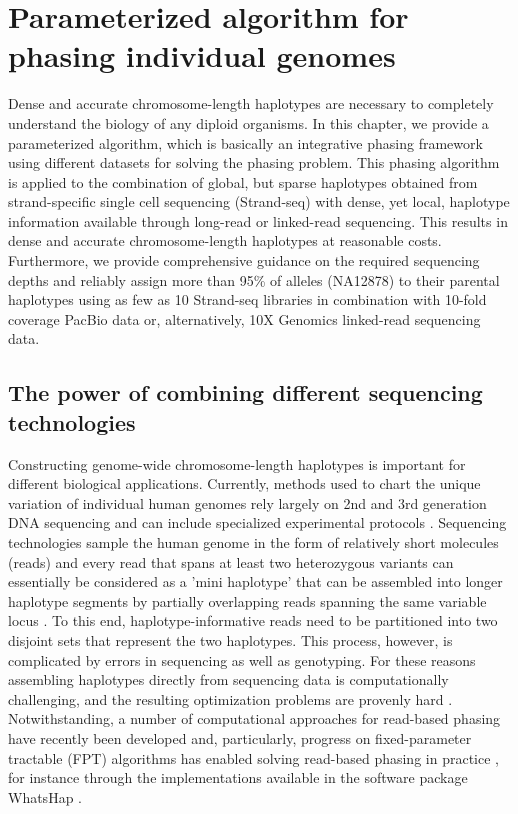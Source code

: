 \chapter{Parameterized algorithm for phasing individual genomes}
Dense and accurate chromosome-length haplotypes are necessary to completely understand the biology of any diploid organisms.  
In this chapter, we provide a parameterized algorithm, which is basically an integrative phasing framework using different datasets for solving the phasing problem. 
This phasing algorithm is applied to the combination of global, but sparse haplotypes obtained from strand-specific single cell sequencing (Strand-seq) with dense, yet local, haplotype information available through long-read or linked-read sequencing.
This results in dense and accurate chromosome-length haplotypes at reasonable costs. 
Furthermore, we provide comprehensive guidance on the required sequencing depths and reliably assign more than 95\% of alleles (NA12878) to their parental haplotypes using as few as 10 Strand-seq libraries in combination with 10-fold coverage PacBio data or, alternatively, 10X Genomics linked-read sequencing data.

\section{The power of combining different sequencing technologies}
Constructing genome-wide chromosome-length haplotypes is important for different biological applications.
Currently, methods used to chart the unique variation of individual human genomes rely largely on 2nd and 3rd generation DNA sequencing and can include specialized experimental protocols \citep{snyder2015haplotype, porubsky2016direct, de2014targeted, amini2014haplotype, selvaraj2013whole}. 
Sequencing technologies sample the human genome in the form of relatively short molecules (reads) and every read that spans at least two heterozygous variants 
can essentially be considered as a 'mini haplotype' that can be assembled into longer haplotype segments by partially overlapping reads spanning the same variable locus \citep{GCR14_whole}. 
To this end, haplotype-informative reads need to be partitioned into two disjoint sets that represent the two haplotypes. 
This process, however, is complicated by errors in sequencing as well as genotyping. 
For these reasons assembling haplotypes directly from sequencing data is computationally challenging, and the resulting optimization problems are provenly hard \citep{cilibrasi2007complexity, lancia2001snps}. 
Notwithstanding, a number of computational approaches for read-based phasing have recently been developed \citep{rhee2016survey} 
and, particularly, progress on fixed-parameter tractable (FPT) algorithms has enabled solving read-based phasing in practice \citep{deng2013highly, Kuleshov2014, Patterson2015}, for instance through the implementations available in the software package WhatsHap \citep{martin2016whatshap}. 

